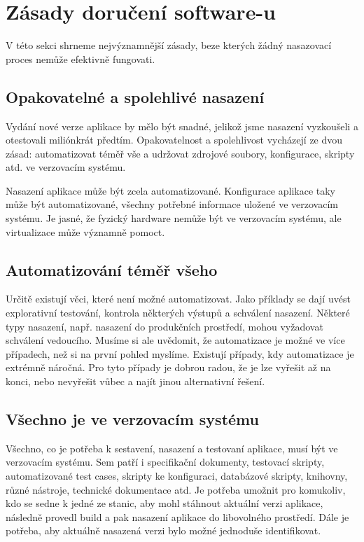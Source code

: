 \section{Zásady doručení software-u}
V této sekci shrneme nejvýznamnější zásady, beze kterých žádný nasazovací proces nemůže efektivně fungovati. 

\subsection{Opakovatelné a spolehlivé nasazení}
Vydání nové verze aplikace by mělo být snadné, jelikož jsme nasazení vyzkoušeli a otestovali miliónkrát předtím. Opakovatelnost a spolehlivost vycházejí ze dvou zásad: automatizovat téměř vše a udržovat zdrojové soubory, konfigurace, skripty atd. ve verzovacím systému.

Nasazení aplikace může být zcela automatizované. Konfigurace aplikace taky může být automatizované, všechny potřebné informace uložené ve verzovacím systému. Je jasné, že fyzický hardware nemůže být ve verzovacím systému, ale virtualizace může významně pomoct.

\subsection{Automatizování téměř všeho}
Určitě existují věci, které není možné automatizovat. Jako příklady se dají uvést explorativní testování, kontrola některých výstupů a schválení nasazení. Některé typy nasazení, např. nasazení do produkčních prostředí, mohou vyžadovat schválení vedoucího. Musíme si ale uvědomit, že automatizace je možné ve více případech, než si na první pohled myslíme. Existují případy, kdy automatizace je extrémně náročná. Pro tyto případy je dobrou radou, že je lze vyřešit až na konci, nebo nevyřešit vůbec a najít jinou alternativní řešení. 

\subsection{Všechno je ve verzovacím systému}
Všechno, co je potřeba k sestavení, nasazení a testovaní aplikace, musí být ve verzovacím systému. Sem patří i specifikační dokumenty, testovací skripty, automatizované test cases, skripty ke konfiguraci, databázové skripty, knihovny, různé nástroje, technické dokumentace atd.
Je potřeba umožnit pro komukoliv, kdo se sedne k jedné ze stanic, aby mohl stáhnout aktuální verzi aplikace, následně provedl build a pak nasazení aplikace do libovolného prostředí. Dále je potřeba, aby aktuálně nasazená verzi bylo možné jednoduše identifikovat.

